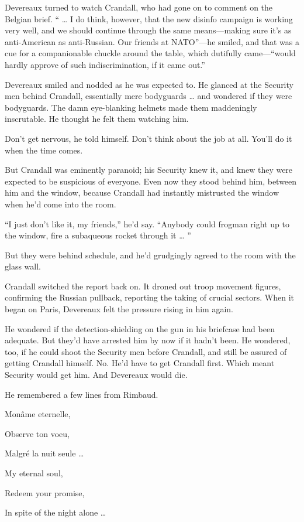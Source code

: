 Devereaux turned to watch Crandall, who had gone on to comment on the Belgian brief. “ … I do think, however, that the new disinfo campaign is working very well, and we should continue through the same means—making sure it’s as anti-American as anti-Russian. Our friends at NATO”—he smiled, and that was a cue for a companionable chuckle around the table, which dutifully came—“would hardly approve of such indiscrimination, if it came out.”

Devereaux smiled and nodded as he was expected to. He glanced at the Security men behind Crandall, essentially mere bodyguards … and wondered if they were bodyguards. The damn eye-blanking helmets made them maddeningly inscrutable. He thought he felt them watching him.

Don’t get nervous, he told himself. Don’t think about the job at all. You’ll do it when the time comes.

But Crandall was eminently paranoid; his Security knew it, and knew they were expected to be suspicious of everyone. Even now they stood behind him, between him and the window, because Crandall had instantly mistrusted the window when he’d come into the room.

“I just don’t like it, my friends,” he’d say. “Anybody could frogman right up to the window, fire a subaqueous rocket through it … ”

But they were behind schedule, and he’d grudgingly agreed to the room with the glass wall.

Crandall switched the report back on. It droned out troop movement figures, confirming the Russian pullback, reporting the taking of crucial sectors. When it began on Paris, Devereaux felt the pressure rising in him again.

He wondered if the detection-shielding on the gun in his briefcase had been adequate. But they’d have arrested him by now if it hadn’t been. He wondered, too, if he could shoot the Security men before Crandall, and still be assured of getting Crandall himself. No. He’d have to get Crandall first. Which meant Security would get him. And Devereaux would die.

He remembered a few lines from Rimbaud.

Monâme eternelle,

Observe ton voeu,

Malgré la nuit seule …

My eternal soul,

Redeem your promise,

In spite of the night alone …

